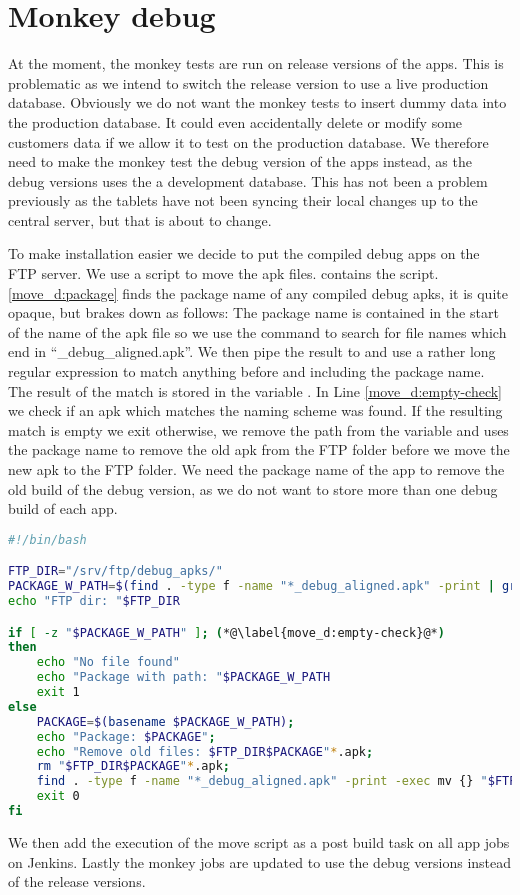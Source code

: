 \chapter{Monkey debug}

At the moment, the monkey tests are run on release versions of the apps. This is problematic as we intend to switch the release version to use a live production database. Obviously we do not want the monkey tests to insert dummy data into the production database. It could even accidentally delete or modify some customers data if we allow it to test on the production database. We therefore need to make the monkey test the debug version of the apps instead, as the debug versions uses the a development database. This has not been a problem previously as the tablets have not been syncing their local changes up to the central server, but that is about to change.

To make installation easier we decide to put the compiled debug apps on the FTP server. We use a  script to move the apk files.  contains the script. \ref{move_d:package} finds the package name of any compiled debug apks, it is quite opaque, but brakes down as follows: The package name is contained in the start of the name of the apk file so we use the  command to search for file names which end in ``\_debug\_aligned.apk''. We then pipe the result to  and use a rather long regular expression to match anything before and including the package name. The result of the match is stored in the variable . In Line \ref{move_d:empty-check} we check if an apk which matches the naming scheme was found. If the resulting match is empty we exit otherwise, we remove the path from the variable  and uses the package name to remove the old apk from the FTP folder before we move the new apk to the FTP folder. We need the package name of the app to remove the old build of the debug version, as we do not want to store more than one debug build of each app.
\begin{lstlisting}[language=bash,showstringspaces=false,caption=Script that moves the debug apk to the ftp server,label=lst:move_debug_apk]
#!/bin/bash

FTP_DIR="/srv/ftp/debug_apks/"
PACKAGE_W_PATH=$(find . -type f -name "*_debug_aligned.apk" -print | grep ".+(?=_v[0-9]+\.[0-9]+b[0-9]+_debug_aligned\.apk)" -Po) (*@\label{move_d:package}@*)
echo "FTP dir: "$FTP_DIR

if [ -z "$PACKAGE_W_PATH" ]; (*@\label{move_d:empty-check}@*)
then
    echo "No file found"
    echo "Package with path: "$PACKAGE_W_PATH
    exit 1
else
    PACKAGE=$(basename $PACKAGE_W_PATH);
    echo "Package: $PACKAGE";
    echo "Remove old files: $FTP_DIR$PACKAGE"*.apk;
    rm "$FTP_DIR$PACKAGE"*.apk;
    find . -type f -name "*_debug_aligned.apk" -print -exec mv {} "$FTP_DIR" \;
    exit 0
fi


\end{lstlisting}
We then add the execution of the move script as a post build task on all app jobs on Jenkins. Lastly the monkey jobs are updated to use the debug versions instead of the release versions.